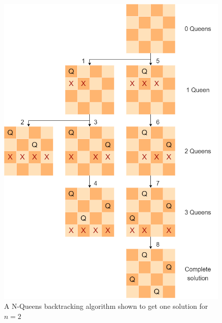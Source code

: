 \begin{figure}[H]
	\centering

	\includegraphics[width=0.5\linewidth]{./graphics/n4_backtracking.drawio.png}
	
	\caption[A N-Queens backtracking algorithm shown to get one solution for \(n = 2\)]{A N-Queens backtracking algorithm shown to get one solution for \(n = 2\)}
	
	\label{fig:n4_backtracking}
	
\end{figure}